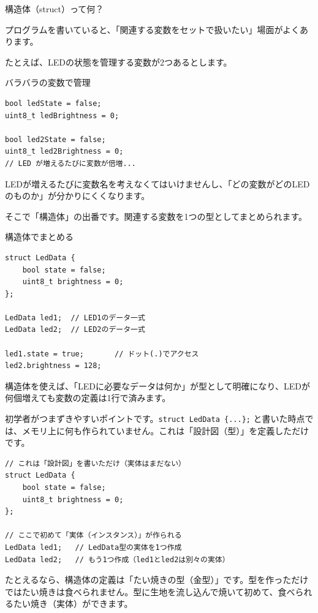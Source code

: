 \begin{qabox}{構造体（struct）って何？}

プログラムを書いていると、「関連する変数をセットで扱いたい」場面がよくあります。

たとえば、LEDの状態を管理する変数が2つあるとします。

\begin{badexample}{バラバラの変数で管理}
\begin{lstlisting}
bool ledState = false;
uint8_t ledBrightness = 0;

bool led2State = false;
uint8_t led2Brightness = 0;
// LED が増えるたびに変数が倍増...
\end{lstlisting}
\end{badexample}

LEDが増えるたびに変数名を考えなくてはいけませんし、「どの変数がどのLEDのものか」が分かりにくくなります。

そこで「構造体」の出番です。関連する変数を1つの型としてまとめられます。

\begin{goodexample}{構造体でまとめる}
\begin{lstlisting}
struct LedData {
    bool state = false;
    uint8_t brightness = 0;
};

LedData led1;  // LED1のデータ一式
LedData led2;  // LED2のデータ一式

led1.state = true;       // ドット(.)でアクセス
led2.brightness = 128;
\end{lstlisting}
\end{goodexample}

構造体を使えば、「LEDに必要なデータは何か」が型として明確になり、LEDが何個増えても変数の定義は1行で済みます。

\begin{cautionbox}
初学者がつまずきやすいポイントです。\texttt{struct LedData \{...\};} と書いた時点では、メモリ上に何も作られていません。これは「設計図（型）」を定義しただけです。

\begin{lstlisting}
// これは「設計図」を書いただけ（実体はまだない）
struct LedData {
    bool state = false;
    uint8_t brightness = 0;
};

// ここで初めて「実体（インスタンス）」が作られる
LedData led1;   // LedData型の実体を1つ作成
LedData led2;   // もう1つ作成（led1とled2は別々の実体）
\end{lstlisting}

たとえるなら、構造体の定義は「たい焼きの型（金型）」です。型を作っただけではたい焼きは食べられません。型に生地を流し込んで焼いて初めて、食べられるたい焼き（実体）ができます。


\end{cautionbox}
\end{qabox}
